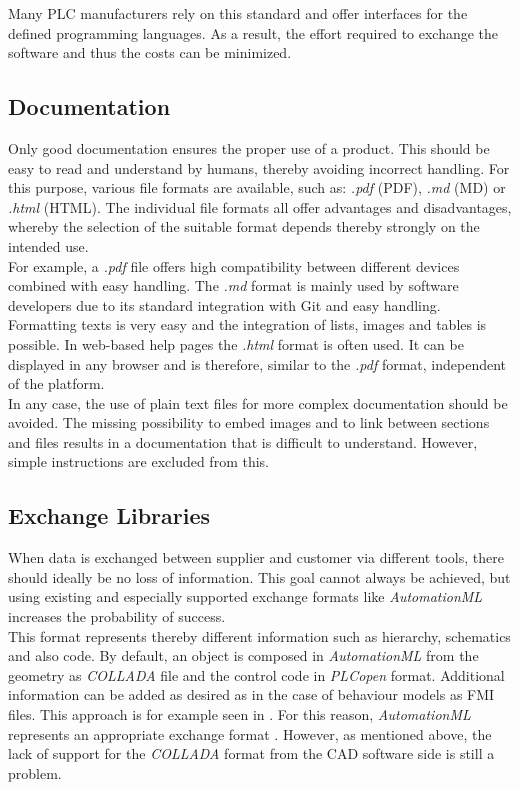     Many PLC manufacturers rely on this standard and offer interfaces for the defined programming languages. As a result, the effort required to exchange the software and thus the costs can be minimized. 


\subsection{Documentation}		%
	Only good documentation ensures the proper use of a product. This should be easy to read and understand by humans, thereby avoiding incorrect handling. For this purpose, various file formats are available, such as: \textit{.pdf} (\acl{PDF}), \textit{.md} (\acl{MD}) or \textit{.html} (\acl{HTML}). The individual file formats all offer advantages and disadvantages, whereby the selection of the suitable format depends thereby strongly on the intended use. \\
	
    For example, a \textit{.pdf} file offers high compatibility between different devices combined with easy handling. 
    The \textit{.md} format is mainly used by software developers due to its standard integration with Git and easy handling. Formatting texts is very easy and the integration of lists, images and tables is possible. 
    In web-based help pages the \textit{.html} format is often used. It can be displayed in any browser and is therefore, similar to the \textit{.pdf} format, independent of the platform. \\
    
	In any case, the use of plain text files for more complex documentation should be avoided. The missing possibility to embed images and to link between sections and files results in a documentation that is difficult to understand. However, simple instructions are excluded from this. 

\subsection{Exchange Libraries}     %
    When data is exchanged between supplier and customer via different tools, there should ideally be no loss of information. This goal cannot always be achieved, but using existing and especially supported exchange formats like \textit{AutomationML} increases the probability of success.  \\
    This format represents thereby different information such as hierarchy, schematics and also code. By default, an object is composed in \textit{AutomationML} from the geometry as \textit{COLLADA} file and the control code in \textit{PLCopen} format. Additional information can be added as desired as in the case of behaviour models as \ac{FMI} files. This approach is for example seen in \cite{AutomationMLWithFMU}. For this reason, \textit{AutomationML} represents an appropriate exchange format \cite{PaperIsAMLanAppropriateExchangeFormat}. However, as mentioned above, the lack of support for the \textit{COLLADA} format from the CAD software side is still a problem.
    
